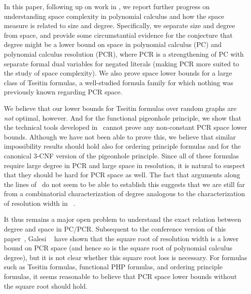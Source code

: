 In this paper, following up on 
%
work in
\cite{BNT13SomeTradeoffs,BG15Framework,FLNRT15SpaceCplx,HN12VirtueSuccinctProofs},
we report further progress on understanding space complexity in
polynomial calculus and how the space measure is related to size and degree.
Specifically, we separate size and degree from
space, and provide some circumstantial evidence for the conjecture
that degree might be a lower bound on space in 
%
polynomial calculus (PC) and polynomial calculus resolution (PCR),
where PCR is a strengthening of PC with separate formal dual variables
for negated literals (making PCR more suited to the
study of space complexity).
We also prove space lower bounds for a large class of Tseitin
formulas, a well-studied formula family for which nothing was
previously known regarding PCR space.

We 
%
believe that our lower bounds for Tseitin formulas
over random graphs are \emph{not} optimal, however. And for the
functional pigeonhole principle, we show that the technical tools
developed in~%
\cite{BG15Framework}
cannot prove any non-constant PCR space lower bounds. Although we have
not been able to prove this, we believe that similar impossibility
results should hold also for ordering principle formulas and for the
canonical \mbox{$3$-CNF} version of the pigeonhole principle.
Since all of these formulas require large degree in PCR
and large space in resolution, it is natural to suspect that
they should be hard for PCR space as well.
The fact that arguments along the lines of~%
\cite{BG15Framework}
do not seem to be able to establish this suggests that we are still
far from a combinatorial characterization of degree analogous to
the characterization of resolution width 
in~%
\cite{AD08CombinatoricalCharacterization}.

It thus remains a major open problem to understand the exact
relation between degree and space in PC/PCR.
Subsequent to the conference version of this
paper~\cite{conf-version}, %
Galesi \etal~\cite{GKT19SpaceWidth} have shown that
%
%
%
the square root of resolution width %
is a lower bound on PCR space %
(and hence so is the square root of polynomial calculus degree), %
but it is not clear whether this square root loss is necessary.
For formulas such as Tseitin formulas, functional PHP formulas, and
ordering principle formulas, it seems reasonable to believe that PCR space
lower bounds without the square root should hold.


